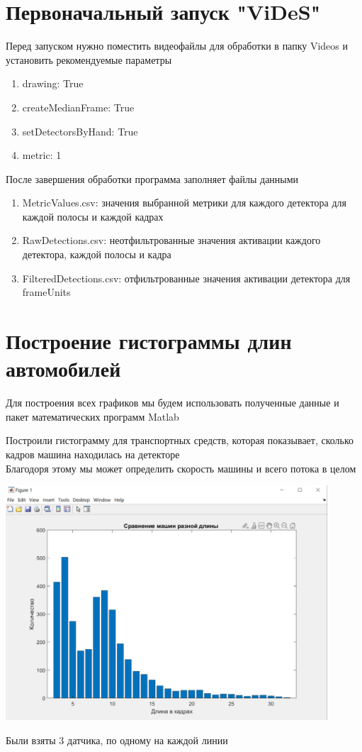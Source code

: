 \documentclass[a4paper,12pt]{article}
\begin{document}
\section*{Первоначальный запуск "ViDeS"}
Перед запуском нужно поместить видеофайлы для обработки в папку Videos
и установить рекомендуемые параметры
\begin{enumerate}
    \item drawing: True
    \item createMedianFrame: True
    \item setDetectorsByHand: True
    \item metric: 1
\end{enumerate}
После завершения обработки программа заполняет файлы данными
\begin{enumerate}
    \item MetricValues.csv: значения выбранной метрики для каждого детектора для каждой полосы и каждой кадрах
    \item RawDetections.csv: неотфильтрованные значения активации каждого детектора, каждой полосы и кадра
    \item FilteredDetections.csv: отфильтрованные значения активации детектора для frameUnits
\end{enumerate}


\section*{Построение гистограммы длин автомобилей}
Для построения всех графиков мы будем использовать полученные данные и пакет математических программ Matlab

Построили гистограмму для транспортных средств, которая показывает, сколько кадров машина находилась на детекторе\\
Благодоря этому мы может определить скорость машины и всего потока в целом
\begin{center}
\includegraphics[width=0.9\textwidth]{images/histogram.jpg}
\end{center}
\begin{center}
Были взяты 3 датчика, по одному на каждой линии
\end{center}
\end{document}

